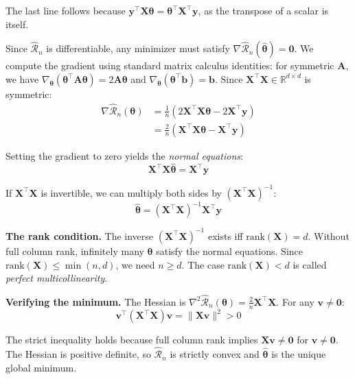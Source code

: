 \documentclass[main.tex]{subfiles}
\begin{document}
The last line follows because $\mathbf{y}^\top\mathbf{X}\boldsymbol{\theta} = \boldsymbol{\theta}^\top\mathbf{X}^\top\mathbf{y}$, as the transpose of a scalar is itself.

Since $\hat{\mathcal{R}}_n$ is differentiable, any minimizer must satisfy $\nabla\hat{\mathcal{R}}_n(\hat{\boldsymbol{\theta}}) = \mathbf{0}$. We compute the gradient using standard matrix calculus identities: for symmetric $\mathbf{A}$, we have $\nabla_{\boldsymbol{\theta}}(\boldsymbol{\theta}^\top \mathbf{A} \boldsymbol{\theta}) = 2\mathbf{A}\boldsymbol{\theta}$ and $\nabla_{\boldsymbol{\theta}}(\boldsymbol{\theta}^\top \mathbf{b}) = \mathbf{b}$. Since $\mathbf{X}^\top\mathbf{X} \in \mathbb{R}^{d \times d}$ is symmetric:
\begin{align}
\nabla\hat{\mathcal{R}}_n(\boldsymbol{\theta}) &= \frac{1}{n}\left(2\mathbf{X}^\top\mathbf{X}\boldsymbol{\theta} - 2\mathbf{X}^\top\mathbf{y}\right) \\[8pt]
&= \frac{2}{n}\left(\mathbf{X}^\top\mathbf{X}\boldsymbol{\theta} - \mathbf{X}^\top\mathbf{y}\right)
\end{align}

Setting the gradient to zero yields the \textit{normal equations}:
$$\mathbf{X}^\top\mathbf{X}\hat{\boldsymbol{\theta}} = \mathbf{X}^\top\mathbf{y}$$

If $\mathbf{X}^\top\mathbf{X}$ is invertible, we can multiply both sides by $(\mathbf{X}^\top\mathbf{X})^{-1}$:
$$\boxed{\hat{\boldsymbol{\theta}} = (\mathbf{X}^\top\mathbf{X})^{-1}\mathbf{X}^\top\mathbf{y}}$$

\textbf{The rank condition.} The inverse $(\mathbf{X}^\top\mathbf{X})^{-1}$ exists iff $\text{rank}(\mathbf{X}) = d$. Without full column rank, infinitely many $\boldsymbol{\theta}$ satisfy the normal equations. Since $\text{rank}(\mathbf{X}) \leq \min(n, d)$, we need $n \geq d$. The case $\text{rank}(\mathbf{X}) < d$ is called \textit{perfect multicollinearity}.

\textbf{Verifying the minimum.} The Hessian is $\nabla^2\hat{\mathcal{R}}_n(\boldsymbol{\theta}) = \frac{2}{n}\mathbf{X}^\top\mathbf{X}$. For any $\mathbf{v} \neq \mathbf{0}$:
$$\mathbf{v}^\top(\mathbf{X}^\top\mathbf{X})\mathbf{v} = \|\mathbf{X}\mathbf{v}\|^2 > 0$$

The strict inequality holds because full column rank implies $\mathbf{X}\mathbf{v} \neq \mathbf{0}$ for $\mathbf{v} \neq \mathbf{0}$. The Hessian is positive definite, so $\hat{\mathcal{R}}_n$ is strictly convex and $\hat{\boldsymbol{\theta}}$ is the unique global minimum.
\end{document}
